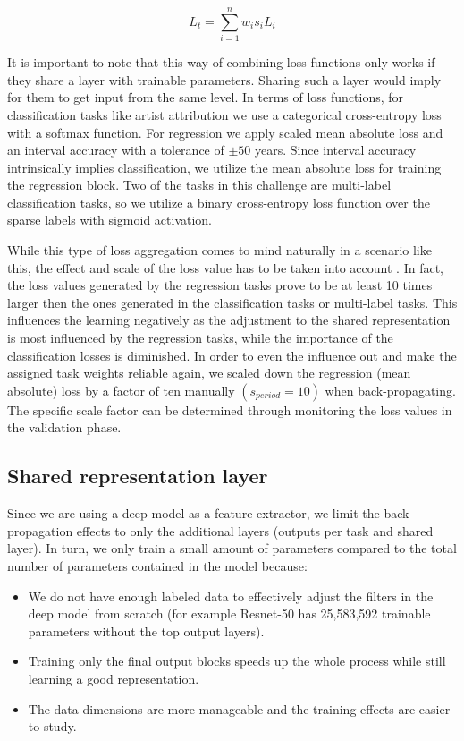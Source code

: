 \documentclass[sigconf]{acmart}
\begin{document}
\begin{equation}
L_{t}=\sum_{i=1}^{n}w_{i}s_{i}L_{i}
\end{equation}

It is important to note that this way of combining loss functions only works if they share a layer with trainable parameters. Sharing such a layer would imply for them to get input from the same level. In terms of loss functions, for classification tasks like artist attribution we use a categorical cross-entropy loss with a softmax function. For regression we apply scaled mean absolute loss and an interval accuracy with a tolerance of $\pm 50$ years. Since interval accuracy intrinsically implies classification, we utilize the mean absolute loss for training the regression block. Two of the tasks in this challenge are multi-label classification tasks, so we utilize a binary cross-entropy loss function over the sparse labels with sigmoid activation. 

While this type of loss aggregation comes to mind naturally in a scenario like this, the effect and scale of the loss value has to be taken into account \cite{sculley2010combined}. In fact, the loss values generated by the regression tasks prove to be at least 10 times larger then the ones generated in the classification tasks or multi-label tasks. This influences the learning negatively as the adjustment to the shared representation is most influenced by the regression tasks, while the importance of the classification losses is diminished. In order to even the influence out and make the assigned task weights reliable again, we scaled down the regression (mean absolute) loss by a factor of ten manually 
\begin{math}
(s_{period} = 10) 
\end{math}
when back-propagating. The specific scale factor can be determined through monitoring the loss values in the validation phase. 

\subsection{Shared representation layer}

Since we are using a deep model as a feature extractor, we limit the back-propagation effects to only the additional layers (outputs per task and shared layer). In turn, we only train a small amount of parameters compared to the total number of parameters contained in the model because:

\begin{itemize}
  \item We do not have enough labeled data to effectively adjust the filters in the deep model from scratch (for example Resnet-50 has 25,583,592 trainable parameters without the top output layers).
  \item Training only the final output blocks speeds up the whole process while still learning a good representation.
  \item The data dimensions are more manageable and the training effects are easier to study.
\end{itemize}
\end{document}
